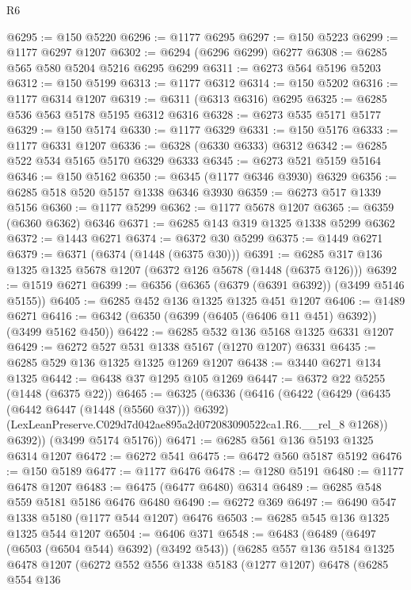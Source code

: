 \begin{lexlean}{R6}
\begin{coremodule}
@6295 := @150 @5220
@6296 := @1177 @6295
@6297 := @150 @5223
@6299 := @1177 @6297 @1207
@6302 := @6294 (@6296 @6299) @6277
@6308 := @6285 @565 @580 @5204 @5216 @6295 @6299
@6311 := @6273 @564 @5196 @5203
@6312 := @150 @5199
@6313 := @1177 @6312
@6314 := @150 @5202
@6316 := @1177 @6314 @1207
@6319 := @6311 (@6313 @6316) @6295
@6325 := @6285 @536 @563 @5178 @5195 @6312 @6316
@6328 := @6273 @535 @5171 @5177
@6329 := @150 @5174
@6330 := @1177 @6329
@6331 := @150 @5176
@6333 := @1177 @6331 @1207
@6336 := @6328 (@6330 @6333) @6312
@6342 := @6285 @522 @534 @5165 @5170 @6329 @6333
@6345 := @6273 @521 @5159 @5164
@6346 := @150 @5162
@6350 := @6345 (@1177 @6346 @3930) @6329
@6356 := @6285 @518 @520 @5157 @1338 @6346 @3930
@6359 := @6273 @517 @1339 @5156
@6360 := @1177 @5299
@6362 := @1177 @5678 @1207
@6365 := @6359 (@6360 @6362) @6346
@6371 := @6285 @143 @319 @1325 @1338 @5299 @6362
@6372 := @1443 @6271
@6374 := @6372 @30 @5299
@6375 := @1449 @6271
@6379 := @6371 (@6374 (@1448 (@6375 @30)))
@6391 := @6285 @317 @136 @1325 @1325 @5678 @1207 (@6372 @126 @5678 (@1448 (@6375 @126)))
@6392 := @1519 @6271
@6399 := @6356 (@6365 (@6379 (@6391 @6392)) (@3499 @5146 @5155))
@6405 := @6285 @452 @136 @1325 @1325 @451 @1207
@6406 := @1489 @6271
@6416 := @6342 (@6350 (@6399 (@6405 (@6406 @11 @451) @6392)) (@3499 @5162 @450))
@6422 := @6285 @532 @136 @5168 @1325 @6331 @1207
@6429 := @6272 @527 @531 @1338 @5167 (@1270 @1207) @6331
@6435 := @6285 @529 @136 @1325 @1325 @1269 @1207
@6438 := @3440 @6271 @134 @1325
@6442 := @6438 @37 @1295 @105 @1269
@6447 := @6372 @22 @5255 (@1448 (@6375 @22))
@6465 := @6325
    (@6336
      (@6416
        (@6422
          (@6429
            (@6435 (@6442 @6447 (@1448 (@5560 @37))) @6392)
            (LexLeanPreserve.C029d7d042ae895a2d072083090522ca1.R6.__rel_8 @1268))
          @6392))
      (@3499 @5174 @5176))
@6471 := @6285 @561 @136 @5193 @1325 @6314 @1207
@6472 := @6272 @541
@6475 := @6472 @560 @5187 @5192
@6476 := @150 @5189
@6477 := @1177 @6476
@6478 := @1280 @5191
@6480 := @1177 @6478 @1207
@6483 := @6475 (@6477 @6480) @6314
@6489 := @6285 @548 @559 @5181 @5186 @6476 @6480
@6490 := @6272 @369
@6497 := @6490 @547 @1338 @5180 (@1177 @544 @1207) @6476
@6503 := @6285 @545 @136 @1325 @1325 @544 @1207
@6504 := @6406 @371
@6548 := @6483
    (@6489
      (@6497 (@6503 (@6504 @544) @6392) (@3492 @543))
      (@6285
        @557
        @136
        @5184
        @1325
        @6478
        @1207
        (@6272
          @552
          @556
          @1338
          @5183
          (@1277 @1207)
          @6478
          (@6285
            @554
            @136

\end{coremodule}
\end{lexlean}
